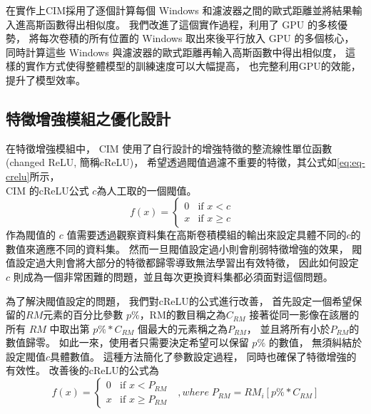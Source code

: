 \documentclass[class=NCU_thesis, crop=false]{standalone}
\begin{document}
	在實作上CIM採用了逐個計算每個 Windows 和濾波器之間的歐式距離並將結果輸入進高斯函數得出相似度。
	我們改進了這個實作過程，利用了 GPU 的多核優勢，
	將每次卷積的所有位置的 Windows 取出來後平行放入 GPU 的多個核心，
	同時計算這些 Windows 與濾波器的歐式距離再輸入高斯函數中得出相似度，
	這樣的實作方式使得整體模型的訓練速度可以大幅提高，
	也完整利用GPU的效能，提升了模型效率。

	\pagebreak

	\subsection{特徵增強模組之優化設計}
	在特徵增強模組中，
	CIM 使用了自行設計的增強特徵的整流線性單位函數(changed ReLU, 簡稱cReLU)，
	希望透過閥值過濾不重要的特徵，其公式如\cref{eq:eq-crelu}所示，\\
	CIM 的cReLU公式\cite{YangCNNInterpretable} $c$為人工取的一個閥值。
	\begin{equation}
	    \label{eq:eq-crelu}
	    f(x)= 
	    \begin{cases}
	        0 & \text{if  $x < c$ }\\
	        x & \text{if  $x \geq c$}
	    \end{cases}
	\end{equation}
	作為閥值的 $c$ 值需要透過觀察資料集在高斯卷積模組的輸出來設定具體不同的$c$的數值來適應不同的資料集。
	然而一旦閥值設定過小則會削弱特徵增強的效果，
	閥值設定過大則會將大部分的特徵都歸零導致無法學習出有效特徵，
	因此如何設定 $c$ 則成為一個非常困難的問題，並且每次更換資料集都必須面對這個問題。

	為了解決閥值設定的問題，
	我們對cReLU的公式進行改善，
	首先設定一個希望保留的$RM$元素的百分比參數 $p\%$，RM的數目稱之為$C_{RM}$
	接著從同一影像在該層的所有 $RM$ 中取出第 $p\% * C_{RM}$  個最大的元素稱之為$P_{RM}$，
	並且將所有小於$P_{RM}$的數值歸零。
	如此一來，使用者只需要決定希望可以保留 $p\%$ 的數值，
	無須糾結於設定閥值$c$具體數值。
	這種方法簡化了參數設定過程，
	同時也確保了特徵增強的有效性。
	改善後的cReLU的公式為\\
	\begin{equation}
	    \label{eq:eq-cReLUPercent}
	    f(x)= 
	    \begin{cases}
	        0 & \text{if  $x < P_{RM}$ }\\
	        x & \text{if  $x \geq P_{RM}$}
	    \end{cases}, where \; P_{RM} = RM_{i}\left[ p\% * C_{RM} \right]
	\end{equation}
\end{document}
